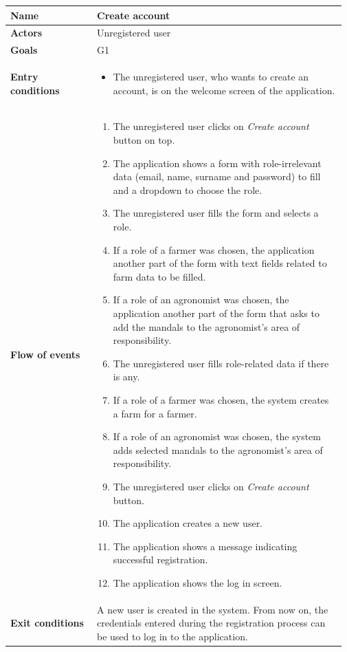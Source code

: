 \begin{table}[H]
	\begin{tabular}{@{}p{0.25\linewidth} p{0.72\linewidth}@{}}
		\toprule
		\textbf{Name}               & Create account \\
		\midrule
		\textbf{Actors}             & Unregistered user \\
		\midrule
		\textbf{Goals}              & G1 \\
		\midrule
		
		\textbf{Entry conditions}   & \begin{itemize}[leftmargin=.4cm,noitemsep,topsep=0pt,before=\vspace{-3mm},after=\vspace{-4mm}]
		    \item The unregistered user, who wants to create an account, is  on the welcome screen of the application.
		\end{itemize}\\
		\midrule
		
		\textbf{Flow of events}     & \begin{enumerate}[leftmargin=.4cm,noitemsep,topsep=0pt,before=\vspace{-3mm},after=\vspace{-4mm}]
		    \item The unregistered user clicks on \textit{Create account} button on top.
		    \item The application shows a form with role-irrelevant data (email, name, surname and password) to fill and a dropdown to choose the role.
		    \item The unregistered user fills the form and selects a role.
		    \item If a role of a farmer was chosen, the application another part of the form with text fields related to farm data to be filled.
		    \item If a role of an agronomist was chosen, the application another part of the form that asks to add the mandals to the agronomist's area of responsibility.
		    \item The unregistered user fills role-related data if there is any.
		    \item If a role of a farmer was chosen, the system creates a farm for a farmer.
		    \item If a role of an agronomist was chosen, the system adds selected mandals to the agronomist's area of responsibility.
		    \item The unregistered user clicks on \textit{Create account} button.
		    \item The application creates a new user.
		    \item The application shows a message indicating successful registration.
		    \item The application shows the log in screen.
		\end{enumerate}\\
		\midrule
		\textbf{Exit conditions}    & A new user is created in the system. From now on, the credentials entered during the registration process can be used to log in to the application. \\
		\midrule
		

\end{tabular}
\end{table}
